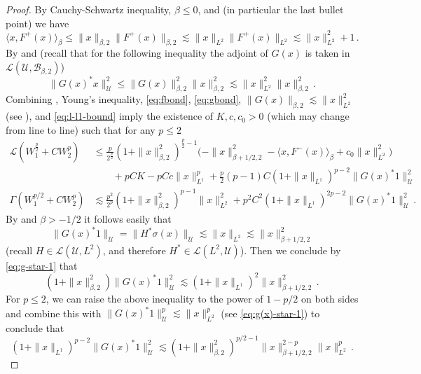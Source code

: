 \documentclass[final]{amsart}
\numberwithin{thm}{section}
\numberwithin{equation}{section}
\newcommand{\U}{\mathcal{U}}
\newcommand{\Ll}{\mathcal{L}}
\newcommand{\ip}[2]{\langle #1, #2 \rangle}
\newcommand{\B}{\mathcal{B}}
\begin{document}
\begin{proof}
    By Cauchy-Schwartz inequality, $\beta \leq 0$, and  (in particular the last bullet point) we have
\begin{equation}\label{eq:fbond}
\ip{x}{F^+(x)}_\beta \leq \|x\|_{\beta,2}\|F^+(x)\|_{\beta,2} \lesssim \|x\|_{L^2}\|F^+(x)\|_{L^2} \lesssim \|x\|_{L^2}^2+1 \,.
\end{equation}
By  and  (recall that for the following inequality the adjoint of $G(x)$ is taken in $\Ll(\U,\B_{\beta,2})$)
\begin{equation}\label{eq:gbond}
\|G(x)^*x\|_\U^2 \leq \|G(x)\|_{\beta,2}^2\|x\|_{\beta,2}^2 \lesssim \|x\|_{L^2}^2\|x\|_{\beta,2}^2 \,.    
\end{equation}
Combining , Young's inequality, \eqref{eq:fbond}, \eqref{eq:gbond}, $\|G(x)\|_{\beta,2} \lesssim \|x\|_{L^2}^2$ (see ), and \eqref{eq:l-l1-bound} imply the existence of $K,c, c_0 > 0$ (which may change from line to line) such that for any $p \leq 2$ 
\begin{equation*}
    \begin{aligned}
    \Ll (W_1^{\frac{p}{2}} + CW_2^p) &\leq \frac{p}{2^{\frac{p}{2}}}(1+\|x\|_{\beta,2}^2)^{\frac{p}{2}-1}\Big(-\|x\|_{\beta+1/2,2}^2 -\ip{x}{F^-(x)}_\beta + c_0\|x\|_{L^2}^2\Big) \\
    &\qquad + pCK - pCc\|x\|_{L^1}^p + \frac{p}{2}(p-1)C(1+\|x\|_{L^1})^{p-2}\|G(x)^*1\|_\U^2
    \\
    \Gamma(W_1^{p/2} + CW_2^p) &\lesssim \frac{p^2}{2^p}(1+\|x\|_{\beta,2}^2)^{p-1}\|x\|_{L^2}^2 + p^2C^2(1+\|x\|_{L^1})^{2p-2}\|G(x)^*1\|_\U^2 \,.
    \end{aligned}
\end{equation*}
By  and $\beta > -1/2$ it follows easily that
\begin{equation}\label{eq:g(x)-star-1}
    \|G(x)^*1\|_\U = \|H^* \sigma(x)\|_\U \lesssim \|x\|_{L^2} \lesssim \|x\|_{\beta+1/2,2}^2
\end{equation}
(recall $H \in \Ll(\U,L^2)$, and therefore $H^* \in \Ll(L^2,\U)$). Then we conclude by \eqref{eq:g-star-1} that
\begin{equation*}
    (1+\|x\|_{\beta,2}^2)\|G(x)^*1\|_\U^2 \lesssim (1+\|x\|_{L^1})^2\|x\|_{\beta+1/2,2}^2 \,.
\end{equation*}
For $p \leq 2$, we can raise the above inequality to the power of $1-p/2$ on both sides and combine this with $\|G(x)^*1\|_\U^p \lesssim \|x\|_{L^2}^p$ (see \eqref{eq:g(x)-star-1}) to conclude that
\begin{equation}\label{eq:turning-l1-to-beta}
    (1+\|x\|_{L^1})^{p-2}\|G(x)^*1\|_\U^2 \lesssim (1+\|x\|_{\beta,2}^2)^{p/2-1}\|x\|_{\beta+1/2,2}^{2-p}\|x\|_{L^2}^p \,.
\end{equation}


\end{proof}
\end{document}
